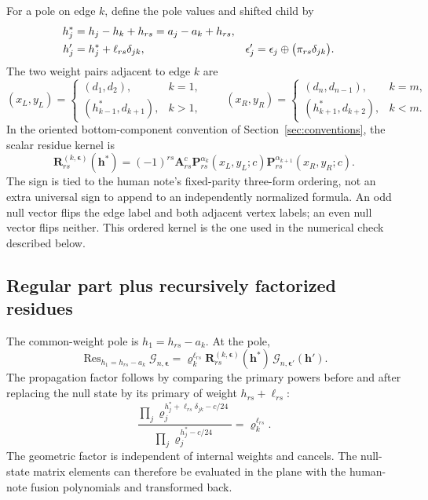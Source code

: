 \documentclass[11pt]{article}
\numberwithin{equation}{section}
\newcommand{\cG}{\mathcal G}
\newcommand{\ve}{\boldsymbol\epsilon}
\newcommand{\vh}{\boldsymbol h}
\DeclareMathOperator*{\Res}{Res}
\begin{document}
For a pole on edge $k$, define the pole values and shifted child by
\begin{align}
 h_j^*&=h_j-h_k+h_{rs}=a_j-a_k+h_{rs},\notag\\
 h'_j&=h_j^*+\ell_{rs}\delta_{jk},&
 \epsilon'_j&=\epsilon_j\oplus\bigl(\pi_{rs}\delta_{jk}\bigr).
 \label{eq:child}
\end{align}
The two weight pairs adjacent to edge $k$ are
\begin{equation}
 (x_L,y_L)=
 \begin{cases}(d_1,d_2),&k=1,\\
              (h_{k-1}^*,d_{k+1}),&k>1,
 \end{cases}
 \qquad
 (x_R,y_R)=
 \begin{cases}(d_n,d_{n-1}),&k=m,\\
              (h_{k+1}^*,d_{k+2}),&k<m.
 \end{cases}
 \label{eq:adjacent-pairs}
\end{equation}
In the oriented bottom-component convention of
Section~\ref{sec:conventions}, the scalar residue kernel is
\begin{equation}
 \boxed{\quad
 \mathbf R^{(k,\ve)}_{rs}(\vh^*)
 =(-1)^{rs}\mathbf A^c_{rs}
   \mathbf P^{\alpha_k}_{rs}(x_L,y_L;c)
   \mathbf P^{\alpha_{k+1}}_{rs}(x_R,y_R;c).
 \quad}
 \label{eq:R}
\end{equation}
The sign is tied to the human note's fixed-parity three-form ordering,
not an extra universal sign to append to an independently normalized
formula. An odd null vector flips the edge label and both adjacent
vertex labels; an even null vector flips neither. This ordered kernel
is the one used in the numerical check described below.

\subsection{Regular part plus recursively factorized residues}

The common-weight pole is $h_1=h_{rs}-a_k$. At the pole,
\begin{equation}
 \Res_{h_1=h_{rs}-a_k}\cG_{n,\ve}
 =\varrho_k^{\ell_{rs}}
   \mathbf R^{(k,\ve)}_{rs}(\vh^*)\,
   \cG_{n,\ve'}(\vh').
 \label{eq:residue}
\end{equation}
The propagation factor follows by comparing the primary powers before
and after replacing the null state by its primary of weight
$h_{rs}+\ell_{rs}$:
\begin{equation}
 \frac{\prod_j\varrho_j^{h_j^*+\ell_{rs}\delta_{jk}-c/24}}
      {\prod_j\varrho_j^{h_j^*-c/24}}
 =\varrho_k^{\ell_{rs}}.
\end{equation}
The geometric factor is independent of internal weights and cancels.
The null-state matrix elements can therefore be evaluated in the plane
with the human-note fusion polynomials and transformed back.
\end{document}
